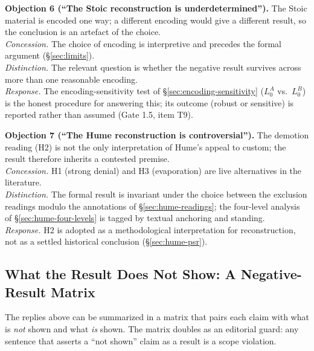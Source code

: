 \documentclass[11pt]{article}
\theoremstyle{plain}
\theoremstyle{definition}
\theoremstyle{remark}
\begin{document}
\medskip
\textbf{Objection 6 (``The Stoic reconstruction is underdetermined'').}
The Stoic material is encoded one way; a different encoding would give
a different result, so the conclusion is an artefact of the choice.\\
\emph{Concession.} The choice of encoding is interpretive and precedes
the formal argument (\S\ref{sec:limits}).\\
\emph{Distinction.} The relevant question is whether the negative
result survives across more than one reasonable encoding.\\
\emph{Response.} The encoding-sensitivity test of
\S\ref{sec:encoding-sensitivity} ($L_0^A$ vs.\ $L_0^B$) is the honest
procedure for answering this; its outcome (robust or sensitive) is
reported rather than assumed (Gate 1.5, item T9).

\medskip
\textbf{Objection 7 (``The Hume reconstruction is controversial'').}
The demotion reading (H2) is not the only interpretation of Hume's
appeal to custom; the result therefore inherits a contested premise.\\
\emph{Concession.} H1 (strong denial) and H3 (evaporation) are live
alternatives in the literature.\\
\emph{Distinction.} The formal result is invariant under the choice
between the exclusion readings modulo the annotations of
\S\ref{sec:hume-readings}; the four-level analysis of
\S\ref{sec:hume-four-levels} is tagged by textual anchoring and
standing.\\
\emph{Response.} H2 is adopted as a methodological interpretation for
reconstruction, not as a settled historical conclusion
(\S\ref{sec:hume-psr}).

\subsection{What the Result Does Not Show: A Negative-Result Matrix}
\label{sec:negative-matrix}

The replies above can be summarized in a matrix that pairs each claim
with what is \emph{not} shown and what \emph{is} shown. The matrix
doubles as an editorial guard: any sentence that asserts a ``not
shown'' claim as a result is a scope violation.
\end{document}
